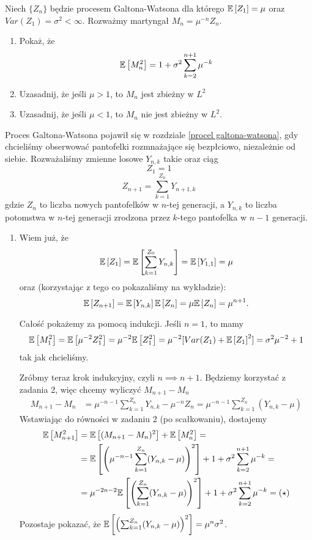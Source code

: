 \begin{problem}
  Niech $\{Z_n\}$ będzie procesem Galtona-Watsona dla którego $\expected{Z_1}=\mu$ oraz $Var(Z_1)=\sigma^2<\infty$. Rozważmy martyngał $M_n=\mu^{-n}Z_n$.
  \begin{enumerate}[label=(\alph*)]
    \item Pokaż, że
      $$\expected{M_n^2}=1+\sigma^2\sum_{k=2}^{n+1}\mu^{-k}$$
    \item Uzasadnij, że jeśli $\mu>1$, to $M_n$ jest zbieżny w $L^2$
    \item Uzasadnij, że jeśli $\mu<1$, to $M_n$ nie jest zbieżny w $L^2$.
  \end{enumerate}
\end{problem}

\begin{solution}
  Proces Galtona-Watsona pojawił się w rozdziale \ref{procel galtona-watsona}, gdy chcieliśmy obserwować pantofelki rozmnażające się bezpłciowo, niezależnie od siebie. Rozważaliśmy zmienne losowe $Y_{n,k}$ takie oraz ciąg
  $$Z_1=1$$
  $$Z_{n+1}=\sum_{k=1}^{Z_n}Y_{n+1,k}$$
  gdzie $Z_n$ to liczba nowych pantofelków w $n$-tej generacji, a $Y_{n,k}$ to liczba potomstwa w $n$-tej generacji zrodzona przez $k$-tego pantofelka w $n-1$ generacji.

  \begin{enumerate}[label=(\alph*)]
    \item Wiem już, że
      $$\expected{Z_1}=\expected{\sum_{k=1}^{Z_0}Y_{n,k}}=\expected{Y_{1,1}}=\mu$$
      oraz (korzystając z tego co pokazaliśmy na wykładzie):
      $$\expected{Z_{n+1}}=\expected{Y_{n,k}}\expected{Z_n}=\mu\expected{Z_n}=\mu^{n+1}.$$

      Całość pokażemy za pomocą indukcji. Jeśli $n=1$, to mamy
      $$\expected{M_1^2}=\expected{\mu^{-2}Z_1^2}=\mu^{-2}\expected{Z_1^2}=\mu^{-2}[Var(Z_1)+\expected{Z_1}^2]=\sigma^2\mu^{-2}+1$$
      tak jak chcieliśmy.

      Zróbmy teraz krok indukcyjny, czyli $n\implies n+1$. Będziemy korzystać z zadania 2, więc chcemy wyliczyć $M_{n+1}-M_n$
      \begin{align*}
        M_{n+1}-M_n&=\mu^{-n-1}\sum_{k=1}^{Z_{n}}Y_{n,k}-\mu^{-n}Z_n=\mu^{-n-1}\sum_{k=1}^{Z_n}(Y_{n,k}-\mu)
      \end{align*}
      Wstawiając do równości w zadaniu 2 (po scałkowaniu), dostajemy
      \begin{align*}
        \expected{M_{n+1}^2}&=\expected{(M_{n+1}-M_n)^2}+\expected{M_{n}^2}=\\ 
                            &=\expected{\left( \mu^{-n-1}\sum_{k=1}^{Z_n}(Y_{n,k}-\mu) \right)^2} +1+\sigma^2\sum_{k=2}^{n+1}\mu^{-k}=\\ 
                            &=\mu^{-2n-2}\expected{\left(\sum_{k=1}^{Z_n}(Y_{n,k}-\mu)\right)^2}+1+\sigma^2\sum_{k=2}^{n+1}\mu^{-k}=(\star)
      \end{align*}
      Pozostaje pokazać, że $\expected{\left(\sum_{k=1}^{Z_n}(Y_{n,k}-\mu)\right)^2}=\mu^{n}\sigma^2$.


\end{enumerate}
\end{solution}
